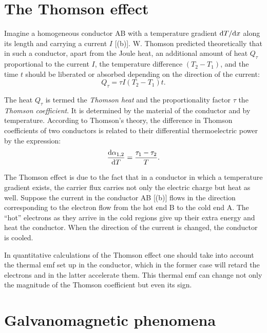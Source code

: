 \section{The Thomson effect}\label{sec:81}

Imagine a homogeneous conductor AB with a temperature gradient $\mathrm{d} T/\mathrm{d} x$ along its length and carrying a current $I$ [(b)]. W. Thomson predicted theoretically that in such a conductor, apart from the Joule heat, an additional amount of heat $Q_{\tau}$ proportional to the current $I$, the temperature difference $(T_2-T_1)$, and the time $t$ should be liberated or absorbed depending on the direction of the current:
\begin{equation}\label{eq:9_30}
    Q_{\tau} = \tau I (T_2 - T_1) t.
\end{equation}

\noindent
The heat $Q_{\tau}$ is termed the \textit{Thomson heat} and the proportionality factor $\tau$ the \textit{Thomson coefficient}. It is determined by the material of the conductor and by temperature. According to Thomson's theory, the difference in Thomson coefficients of two conductors is related to their differential thermoelectric power by the expression:
\begin{equation}\label{eq:9_31}
    \dfrac{\mathrm{d}\alpha_{1,2}}{\mathrm{d} T} = \frac{\tau_1 - \tau_2}{T}.
\end{equation}

The Thomson effect is due to the fact that in a conductor in which a temperature gradient exists, the carrier flux carries not only the electric charge but heat as well. Suppose the current in the conductor AB [(b)] flows in the direction corresponding to the electron flow from the hot end B to the cold end A. The ``hot'' electrons as they arrive in the cold regions give up their extra energy and heat the conductor. When the direction of the current is changed, the conductor is cooled.

In quantitative calculations of the Thomson effect one should take into account the thermal emf set up in the conductor, which in the former case will retard the electrons and in the latter accelerate them. This thermal emf can change not only the magnitude of the Thomson coefficient but even its sign.

\section{Galvanomagnetic phenomena}\label{sec:82}

